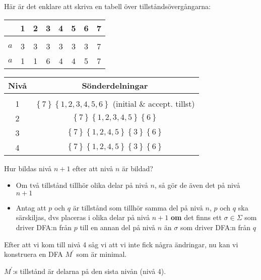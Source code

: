 \par\bigskip
\noindent Här är det enklare att skriva en tabell över tillståndsövergångarna:
\par\bigskip
\begin{center}
  \begin{tabular}{c|c|c|c|c|c|c|c}
    &1&2&3&4&5&6&7\\
    \hline\\
    $a$&3&3&3&3&3&3&7\\
    $a$&1&1&6&4&4&5&7
  \end{tabular}
\end{center}
\par\bigskip
\begin{center}
  \begin{tabular}{c|c}
    Nivå&Sönderdelningar\\
    \hline\\
    1&$\left\{7\right\}\left\{1,2,3,4,5,6\right\}$ (initial \& accept. tillst)\\
    2&$\left\{7\right\}\left\{1,2,3,4,5\right\}\left\{6\right\}$\\
    3&$\left\{7\right\}\left\{1,2,4,5\right\}\left\{3\right\}\left\{6\right\}$\\
    4&$\left\{7\right\}\left\{1,2,4,5\right\}\left\{3\right\}\left\{6\right\}$
  \end{tabular}
\end{center}
\par\bigskip
\noindent Hur bildas nivå $n+1$ efter att nivå $n$ är bildad?\par
\begin{itemize}
  \item Om två tillstånd tillhör olika delar på nivå $n$, så gör de även det på nivå $n+1$
  \item Antag att $p$ och $q$ är tillstånd som tillhör samma del på nivå $n$, $p$ och $q$ ska särskiljas, dvs placeras i olika delar på nivå $n+1$ \textbf{om} det finns ett $\sigma\in\Sigma$ som driver DFA:n från $p$ till en annan del på nivå $n$ än $\sigma$ som driver DFA:n från $q$ 
\end{itemize}
\par\bigskip
\noindent Efter att vi kom till nivå 4 såg vi att vi inte fick några ändringar, nu kan vi konstruera en DFA $M^{\prime}$ som är minimal.\par
\noindent $M^{\prime}$:s tillstånd är delarna på den sista nivån (nivå 4).


